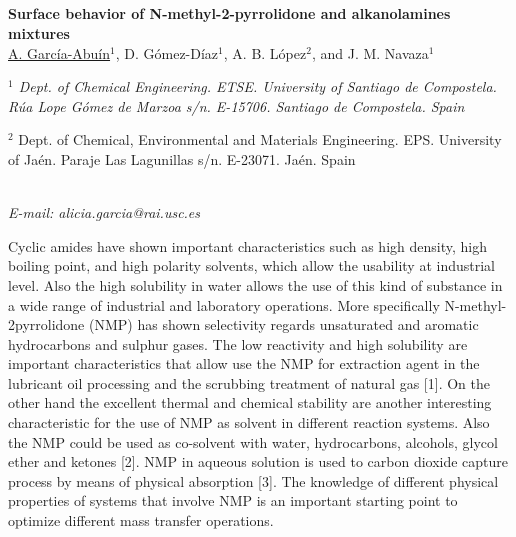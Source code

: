 \setcounter{figure}{0}
\begin{center}
\section*{}
{\bf \Large
Surface behavior of N-methyl-2-pyrrolidone and
alkanolamines mixtures
}
\\
\vspace{0.5cm}
\underline{A. García-Abuín}$^{1}$, D. Gómez-Díaz$^{1}$, A. B. López$^{2}$, and J. M. Navaza$^{1}$
\\
\vspace{0.5cm}
{\it 
$^{1}$ Dept. of Chemical Engineering. ETSE. University of Santiago de Compostela. Rúa Lope Gómez de
Marzoa s/n. E-15706. Santiago de Compostela. Spain

$^{2}$ Dept. of Chemical, Environmental and Materials Engineering. EPS. University of Jaén. Paraje Las
Lagunillas s/n. E-23071. Jaén. Spain
}
\\
\vspace{0.5cm}
{\it E-mail: alicia.garcia@rai.usc.es}
\\
\vspace{0.5cm}
\end{center}
Cyclic amides have shown important characteristics such as high density,
high boiling point, and high polarity solvents, which allow the usability at industrial
level. Also the high solubility in water allows the use of this kind of substance in a
wide range of industrial and laboratory operations. More specifically N-methyl-2pyrrolidone
(NMP) has shown selectivity regards unsaturated and aromatic
hydrocarbons and sulphur gases. The low reactivity and high solubility are important
characteristics that allow use the NMP for extraction agent in the lubricant oil
processing and the scrubbing treatment of natural gas [1]. On the other hand the
excellent thermal and chemical stability are another interesting characteristic for the
use of NMP as solvent in different reaction systems. Also the NMP could be used as
co-solvent with water, hydrocarbons, alcohols, glycol ether and ketones [2]. NMP in
aqueous solution is used to carbon dioxide capture process by means of physical
absorption [3]. The knowledge of different physical properties of systems that
involve NMP is an important starting point to optimize different mass transfer
operations.

